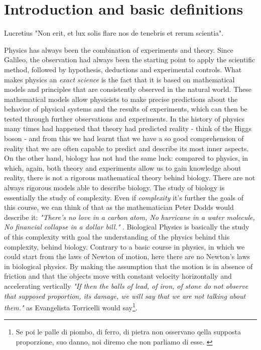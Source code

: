 \documentclass[../main/main.tex]{subfiles}
\begin{document}
\chapter{Introduction and basic definitions}

\begin{chapquote}{Lucretius}
    "Non erit, et lux solis flare nos de tenebris et rerum scientia".
\end{chapquote}




Physics has always been the combination of experiments and theory. Since Galileo, the observation had always been the starting point to apply the scientific method, followed by hypothesis, deductions and experimental controls.  
What makes physics an \emph{exact science} is the fact that it is based on mathematical models and principles that are consistently observed in the natural world. These mathematical models allow physicists to make precise predictions about the behavior of physical systems and the results of experiments, which can then be tested through further observations and experiments.
In the history of physics many times had happened that theory had predicted reality - think of the Higgs boson - and from this we had learnt that we have a so good comprehension of reality that we are often capable to predict and describe its most inner aspects.
On the other hand, biology has not had the same luck: compared to physics, in which, again, both theory and experiments allow us to gain knowledge about reality, there is not a rigorous mathematical theory behind biology.
There are not always rigorous models able to describe biology. The study of biology is essentially the study of complexity.
Even if \emph{complexity} it's further the goals of this course, we can think of that as the mathematician Peter Dodds would describe it: \emph{"There's no love in a carbon atom, No hurricane in a water molecule, No financial collapse in a dollar bill."} \cite{complexity}.
Biological Physics is basically the study of this complexity with goal the understanding of the physics behind this complexity, behind biology. 
Contrary to a basic course in physics, in which we could start from the laws of Newton of motion, here there are no Newton's laws in biological physics. By making the assumption that the motion is in absence of friction and that the objects move with constant velocity horizontally and accelerating vertically \emph{"If then the balls of lead, of iron, of stone do not observe that supposed proportion, its damage, we will say that we are not talking about them."} as Evangelista Torricelli would say\footnote{Se poi le palle di piombo, di ferro, di pietra non osservano qella supposta proporzione, suo danno, noi diremo che non parliamo di esse. \cite{E-Torricelli}}.
\end{document}

